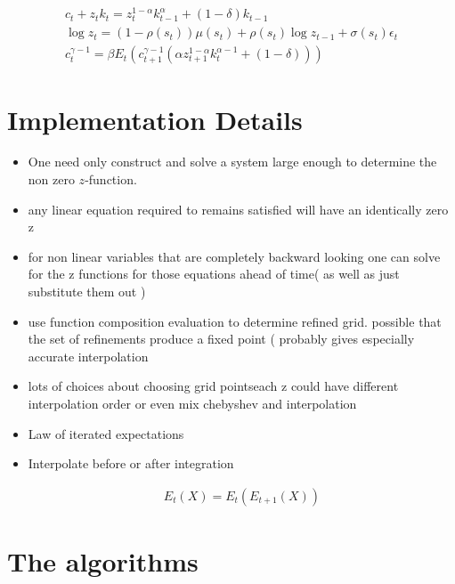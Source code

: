 \documentclass[12pt]{article}
\begin{document}
\begin{gather*}
c_t + z_t k_t = z_t^{1-\alpha} k_{t-1}^\alpha + (1-\delta)k_{t-1}\\
 \log z_t = (1-\rho(s_t))\mu(s_t) + \rho(s_t)\log z_{t-1}+ \sigma(s_t) \epsilon_t\\
 c_t^{\gamma-1} = \beta  
 E_t ( c_{t+1}^{\gamma-1} (\alpha z_{t+1}^{1-\alpha} k_t^{\alpha -1} + (1-\delta) ))
\end{gather*}



\section{Implementation Details }
\label{sec:implementation}



\begin{itemize}
\item One need only construct and solve a system large enough to determine the non zero $z$-function.
\item any linear equation required to remains satisfied will have an identically zero z
\item for non linear variables that are completely backward looking one can solve for the z functions for those equations 
ahead of time( as well as just substitute them out )
\item use function composition evaluation to determine refined grid. possible that the set of refinements produce a fixed point  ( probably gives especially accurate interpolation
\item lots of choices about choosing grid pointseach z could have different interpolation order or even mix chebyshev and interpolation
\item Law of iterated expectations
\item Interpolate before or after integration

  \begin{gather}
    E_t(X) = E_t(E_{t+1}(X))
  \end{gather}
\end{itemize}
  






\appendix
\newpage

     
\section{The algorithms}
\label{sec:algorithms}
\end{document}
